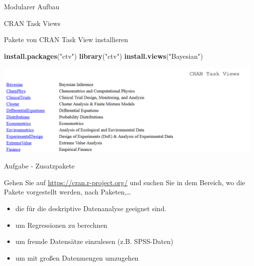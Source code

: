\documentclass[ignorenonframetext,]{beamer}
\newenvironment{Shaded}{}{}
\newcommand{\KeywordTok}[1]{\textcolor[rgb]{0.00,0.44,0.13}{\textbf{{#1}}}}
\newcommand{\StringTok}[1]{\textcolor[rgb]{0.25,0.44,0.63}{{#1}}}
\newcommand{\NormalTok}[1]{{#1}}
\providecommand{\tightlist}{%
\setlength{\itemsep}{0pt}\setlength{\parskip}{0pt}}
\begin{document}
\begin{frame}[fragile]{Modularer Aufbau}
\begin{block}{CRAN Task Views}
\begin{block}{Pakete von CRAN Task View installieren}

\begin{Shaded}
\begin{Highlighting}[]
\KeywordTok{install.packages}\NormalTok{(}\StringTok{"ctv"}\NormalTok{)}
\KeywordTok{library}\NormalTok{(}\StringTok{"ctv"}\NormalTok{)}
\KeywordTok{install.views}\NormalTok{(}\StringTok{"Bayesian"}\NormalTok{)}
\end{Highlighting}
\end{Shaded}

\includegraphics{./tex2pdf.9796/add042645f04b28284c1b44301a5173fdf315965.png}

\end{block}

\end{block}

\begin{block}{Aufgabe - Zusatzpakete}

Gehen Sie auf \url{https://cran.r-project.org/} und suchen Sie in dem
Bereich, wo die Pakete vorgestellt werden, nach Paketen,\ldots{}

\begin{itemize}
\tightlist
\item
  die für die deskriptive Datenanalyse geeignet sind.
\item
  um Regressionen zu berechnen
\item
  um fremde Datensätze einzulesen (z.B. SPSS-Daten)
\item
  um mit großen Datenmengen umzugehen
\end{itemize}

\end{block}

\end{frame}
\end{document}
